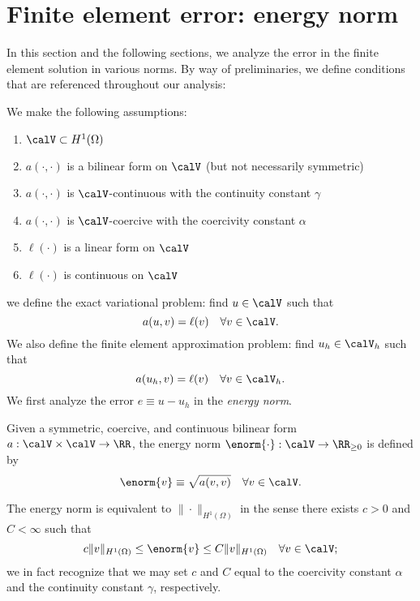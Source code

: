 \section{Finite element error: energy norm}
In this section and the following sections, we analyze the error in the finite element solution in various norms. By way of preliminaries, we define conditions that are referenced throughout our analysis:
\begin{assumption}
  We make the following assumptions:
\begin{enumerate}
  \item $\calV \subset H^1(\Omega)$
  \item $a(\cdot,\cdot)$ is a bilinear form on $\calV$ (but not necessarily symmetric)
  \item $a(\cdot,\cdot)$ is $\calV$-continuous with the continuity constant $\gamma$
  \item $a(\cdot,\cdot)$ is $\calV$-coercive with the coercivity constant $\alpha$
  \item $\ell(\cdot)$ is a linear form on $\calV$
  \item $\ell(\cdot)$ is continuous on $\calV$
\end{enumerate}
\end{assumption}


we define the exact variational problem: find $u \in \calV$ such that
\begin{equation}
  a(u,v) = \ell(v) \quad \forall v \in \calV. \label{eq:th_pde}
\end{equation}
We also define the finite element approximation problem: find $u_h \in \calV_h$ such that
\begin{equation}
  a(u_h,v) = \ell(v) \quad \forall v \in \calV_h. \label{eq:th_fe}
\end{equation}
We first analyze the error $e \equiv u - u_h$ in the \emph{energy norm}. 
\begin{definition}
  Given a symmetric, coercive, and continuous bilinear form $a: \calV \times \calV \to \RR$, the energy norm $\enorm{\cdot} : \calV \to \RR_{\geq 0}$ is defined by
  \begin{equation*}
    \enorm{v} \equiv \sqrt{a(v,v)} \quad \forall v \in \calV.
  \end{equation*}
\end{definition}
The energy norm is equivalent to $\| \cdot \|_{H^1(\Omega)}$ in the sense there exists $c > 0$ and $C < \infty$ such that
\begin{equation*}
  c \| v \|_{H^1(\Omega)} \leq \enorm{v} \leq C \| v \|_{H^1(\Omega)} \quad \forall v \in \calV;
\end{equation*}
we in fact recognize that we may set $c$ and $C$ equal to the coercivity constant $\alpha$ and the continuity constant $\gamma$, respectively.

